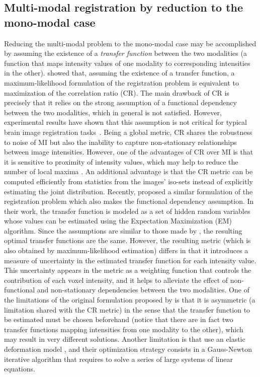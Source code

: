 \subsection{Multi-modal registration by reduction to the mono-modal case}
Reducing the multi-modal problem to the mono-modal case may be accomplished by assuming the existence of a {\it transfer function} between the two modalities (a function that maps intensity values of one modality to corresponding intensities in the other). \cite{Roche2000} showed that, assuming the existence of a transfer function, a maximum-likelihood formulation of the registration problem is equivalent to maximization of the correlation ratio (CR). The main drawback of CR is precisely that it relies on the strong assumption of a functional dependency between the two modalities, which in general is not satisfied. However, experimental results have shown that this assumption is not critical for typical brain image registration tasks~\citep{Roche1998}. Being a global metric, CR shares the robustness to noise of MI but also the inability to capture non-stationary relationships between image intensities. However, one of the advantages of CR over MI is that it is sensitive to proximity of intensity values, which may help to reduce the number of local maxima \citep{Roche1998}. An additional advantage is that the CR metric can be computed efficiently from statistics from the images' iso-sets instead of explicitly estimating the joint distribution. Recently, \cite{Arce-santana2014} proposed a similar formulation of the registration problem which also makes the functional dependency assumption. In their work, the transfer function is modeled as a set of hidden random variables whose values can be estimated using the Expectation Maximization (EM) algorithm. Since the assumptions are similar to those made by \cite{Roche1998, Roche2000}, the resulting optimal transfer functions are the same. However, the resulting metric (which is also obtained by maximum-likelihood estimation) differs in that it introduces a measure of uncertainty in the estimated transfer function for each intensity value. This uncertainty appears in the metric as a weighting function that controls the contribution of each voxel intensity, and it helps to alleviate the effect of non-functional and non-stationary dependencies between the two modalities. One of the limitations of the original formulation proposed by \cite{Arce-santana2014} is that it is asymmetric (a limitation shared with the CR metric) in the sense that the transfer function to be estimated must be chosen beforehand (notice that there are in fact two transfer functions mapping intensities from one modality to the other), which may result in very different solutions. Another limitation is that \cite{Arce-santana2014} use an elastic deformation model \citep{Bajcsy1982, Gee1999}, and their optimization strategy consists in a Gauss-Newton iterative algorithm \citep{GVK502988711} that requires to solve a series of large systems of linear equations.

